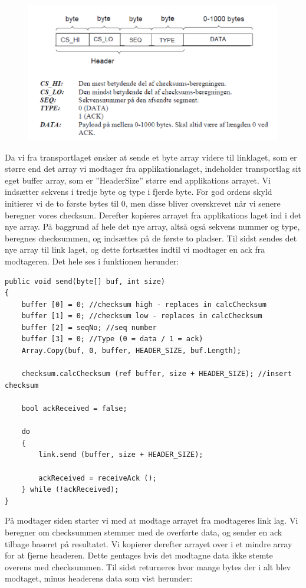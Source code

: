 \begin{figure}[H]
	\centering
	\includegraphics[width=\linewidth]{figs/segment}
	\caption{}
	\label{fig:segment}
\end{figure}

Da vi fra transportlaget ønsker at sende et byte array videre til linklaget, som er større end det array vi
modtager fra applikationslaget, indeholder transportlag sit eget buffer array, som er ”HeaderSize” større
end applikations arrayet. Vi indsætter sekvens i tredje byte og type i fjerde byte. For god ordens skyld
initierer vi de to første bytes til 0, men disse bliver overskrevet når vi senere beregner vores checksum.
Derefter kopieres arrayet fra applikations laget ind i det nye array.
På baggrund af hele det nye array, altså også sekvens nummer og type, beregnes checksummen, og
indsættes på de første to pladser.
Til sidst sendes det nye array til link laget, og dette fortsættes indtil vi modtager en ack fra modtageren. Det
hele ses i funktionen herunder:

\begin{lstlisting}
public void send(byte[] buf, int size)
{
	buffer [0] = 0; //checksum high - replaces in calcChecksum
	buffer [1] = 0; //checksum low - replaces in calcChecksum
	buffer [2] = seqNo; //seq number
	buffer [3] = 0; //Type (0 = data / 1 = ack)
	Array.Copy(buf, 0, buffer, HEADER_SIZE, buf.Length);
	
	checksum.calcChecksum (ref buffer, size + HEADER_SIZE); //insert checksum
	
	bool ackReceived = false;
	
	do 
	{
		link.send (buffer, size + HEADER_SIZE);
		
		ackReceived = receiveAck ();
	} while (!ackReceived);
}
\end{lstlisting}

På modtager siden starter vi med at modtage arrayet fra modtageres link lag. Vi beregner om
checksummen stemmer med de overførte data, og sender en ack tilbage baseret på resultatet. Vi kopierer
derefter arrayet over i et mindre array for at fjerne headeren. Dette gentages hvis det modtagne data ikke
stemte overens med checksummen. Til sidst returneres hvor mange bytes der i alt blev modtaget, minus
headerens data som vist herunder:


